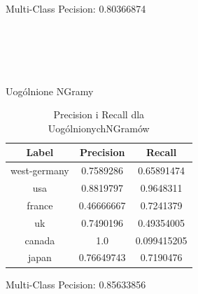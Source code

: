 \documentclass{classrep}
\begin{document}
Multi-Class Pecision: 0.80366874\\
\\
\\
\\
\\
\\
Uogólnione NGramy
\begin{table}[H]
\begin{tabular}{|c|c|c|}
\hline
Label        & Precision  & Recall      \\ \hline
west-germany & 0.7589286  & 0.65891474  \\ \hline
usa          & 0.8819797  & 0.9648311   \\ \hline
france       & 0.46666667 & 0.7241379   \\ \hline
uk           & 0.7490196  & 0.49354005  \\ \hline
canada       & 1.0        & 0.099415205 \\ \hline
japan        & 0.76649743 & 0.7190476   \\ \hline
\end{tabular}
\caption{Precision i Recall dla UogólnionychNGramów}
\end{table}
Multi-Class Pecision: 0.85633856
\end{document}

